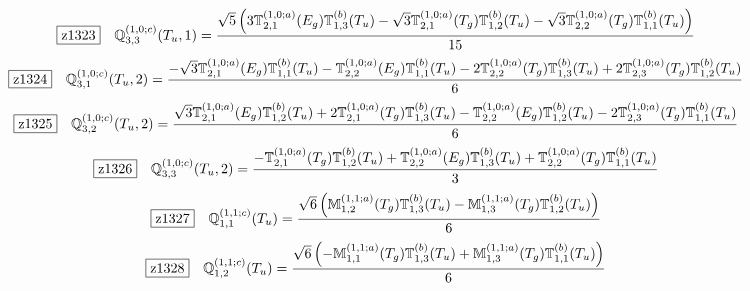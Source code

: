 \documentclass[fleqn,10pt,landscape]{jsarticle}
\begin{document}
\begin{dmath*}
\hspace*{3mm}\fbox{z1323}\quad \mathbb{Q}_{3,3}^{(1,0;c)}(T_{u},1)=\frac{\sqrt{5} \left(3 \mathbb{T}_{2,1}^{(1,0;a)}(E_{g}) \mathbb{T}_{1,3}^{(b)}(T_{u}) - \sqrt{3} \mathbb{T}_{2,1}^{(1,0;a)}(T_{g}) \mathbb{T}_{1,2}^{(b)}(T_{u}) - \sqrt{3} \mathbb{T}_{2,2}^{(1,0;a)}(T_{g}) \mathbb{T}_{1,1}^{(b)}(T_{u})\right)}{15}
\end{dmath*}
\begin{dmath*}
\hspace*{3mm}\fbox{z1324}\quad \mathbb{Q}_{3,1}^{(1,0;c)}(T_{u},2)=\frac{- \sqrt{3} \mathbb{T}_{2,1}^{(1,0;a)}(E_{g}) \mathbb{T}_{1,1}^{(b)}(T_{u}) - \mathbb{T}_{2,2}^{(1,0;a)}(E_{g}) \mathbb{T}_{1,1}^{(b)}(T_{u}) - 2 \mathbb{T}_{2,2}^{(1,0;a)}(T_{g}) \mathbb{T}_{1,3}^{(b)}(T_{u}) + 2 \mathbb{T}_{2,3}^{(1,0;a)}(T_{g}) \mathbb{T}_{1,2}^{(b)}(T_{u})}{6}
\end{dmath*}
\begin{dmath*}
\hspace*{3mm}\fbox{z1325}\quad \mathbb{Q}_{3,2}^{(1,0;c)}(T_{u},2)=\frac{\sqrt{3} \mathbb{T}_{2,1}^{(1,0;a)}(E_{g}) \mathbb{T}_{1,2}^{(b)}(T_{u}) + 2 \mathbb{T}_{2,1}^{(1,0;a)}(T_{g}) \mathbb{T}_{1,3}^{(b)}(T_{u}) - \mathbb{T}_{2,2}^{(1,0;a)}(E_{g}) \mathbb{T}_{1,2}^{(b)}(T_{u}) - 2 \mathbb{T}_{2,3}^{(1,0;a)}(T_{g}) \mathbb{T}_{1,1}^{(b)}(T_{u})}{6}
\end{dmath*}
\begin{dmath*}
\hspace*{3mm}\fbox{z1326}\quad \mathbb{Q}_{3,3}^{(1,0;c)}(T_{u},2)=\frac{- \mathbb{T}_{2,1}^{(1,0;a)}(T_{g}) \mathbb{T}_{1,2}^{(b)}(T_{u}) + \mathbb{T}_{2,2}^{(1,0;a)}(E_{g}) \mathbb{T}_{1,3}^{(b)}(T_{u}) + \mathbb{T}_{2,2}^{(1,0;a)}(T_{g}) \mathbb{T}_{1,1}^{(b)}(T_{u})}{3}
\end{dmath*}
\begin{dmath*}
\hspace*{3mm}\fbox{z1327}\quad \mathbb{Q}_{1,1}^{(1,1;c)}(T_{u})=\frac{\sqrt{6} \left(\mathbb{M}_{1,2}^{(1,1;a)}(T_{g}) \mathbb{T}_{1,3}^{(b)}(T_{u}) - \mathbb{M}_{1,3}^{(1,1;a)}(T_{g}) \mathbb{T}_{1,2}^{(b)}(T_{u})\right)}{6}
\end{dmath*}
\begin{dmath*}
\hspace*{3mm}\fbox{z1328}\quad \mathbb{Q}_{1,2}^{(1,1;c)}(T_{u})=\frac{\sqrt{6} \left(- \mathbb{M}_{1,1}^{(1,1;a)}(T_{g}) \mathbb{T}_{1,3}^{(b)}(T_{u}) + \mathbb{M}_{1,3}^{(1,1;a)}(T_{g}) \mathbb{T}_{1,1}^{(b)}(T_{u})\right)}{6}
\end{dmath*}
\end{document}
